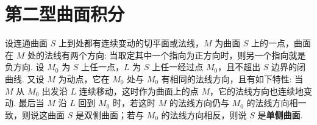 \documentclass[../../main.tex]{subfiles}%
\begin{document}
\section{第二型曲面积分}

\begin{definition}
设连通曲面 $S$ 上到处都有连续变动的切平面或法线，$M$ 为曲面 $S$ 上的一点，曲面在 $M$ 处的法线有两个方向: 当取定其中一个指向为正方向时，则另一个指向就是负方向. 设 $M_0$ 为 $S$ 上任一点，$L$ 为 $S$ 上任一经过点 $M_0$，且不超出 $S$ 边界的闭曲线. 又设 $M$ 为动点，它在 $M_0$ 处与 $M_0$ 有相同的法线方向，且有如下特性: 当 $M$ 从 $M_0$ 出发沿 $L$ 连续移动，这时作为曲面上的点 $M$，它的法线方向也连续地变动. 最后当 $M$ 沿 $L$ 回到 $M_0$ 时，若这时 $M$ 的法线方向仍与 $M_0$ 的法线方向相一致，则说这曲面 $S$ 是双侧曲面；若与 $M_0$ 的法线方向相反，则说 $S$ 是\textbf{单侧曲面}.
\end{definition}
\end{document}
